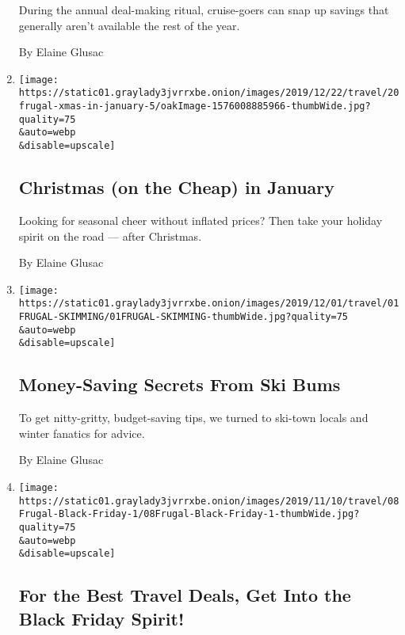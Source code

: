 \begin{enumerate}
  During the annual deal-making ritual, cruise-goers can snap up savings
  that generally aren't available the rest of the year.

  By Elaine Glusac
\item
  \href{/2019/12/20/travel/budget-travel-christmas-january.html}{}

  \texttt{[image: https://static01.graylady3jvrrxbe.onion/images/2019/12/22/travel/20frugal-xmas-in-january-5/oakImage-1576008885966-thumbWide.jpg?quality=75\\\&auto=webp\\\&disable=upscale]}

  \hypertarget{christmas-on-the-cheap-in-january}{%
  \subsection{Christmas (on the Cheap) in
  January}\label{christmas-on-the-cheap-in-january}}

  Looking for seasonal cheer without inflated prices? Then take your
  holiday spirit on the road --- after Christmas.

  By Elaine Glusac
\item
  \href{/2019/11/29/travel/budget-skiing.html}{}

  \texttt{[image: https://static01.graylady3jvrrxbe.onion/images/2019/12/01/travel/01FRUGAL-SKIMMING/01FRUGAL-SKIMMING-thumbWide.jpg?quality=75\\\&auto=webp\\\&disable=upscale]}

  \hypertarget{money-saving-secrets-from-ski-bums}{%
  \subsection{Money-Saving Secrets From Ski
  Bums}\label{money-saving-secrets-from-ski-bums}}

  To get nitty-gritty, budget-saving tips, we turned to ski-town locals
  and winter fanatics for advice.

  By Elaine Glusac
\item
  \href{/2019/11/08/travel/Black-Friday-Travel-Deals.html}{}

  \texttt{[image: https://static01.graylady3jvrrxbe.onion/images/2019/11/10/travel/08Frugal-Black-Friday-1/08Frugal-Black-Friday-1-thumbWide.jpg?quality=75\\\&auto=webp\\\&disable=upscale]}

  \hypertarget{for-the-best-travel-deals-get-into-the-black-friday-spirit}{%
  \subsection{For the Best Travel Deals, Get Into the Black Friday
  Spirit!}\label{for-the-best-travel-deals-get-into-the-black-friday-spirit}}


\end{enumerate}
